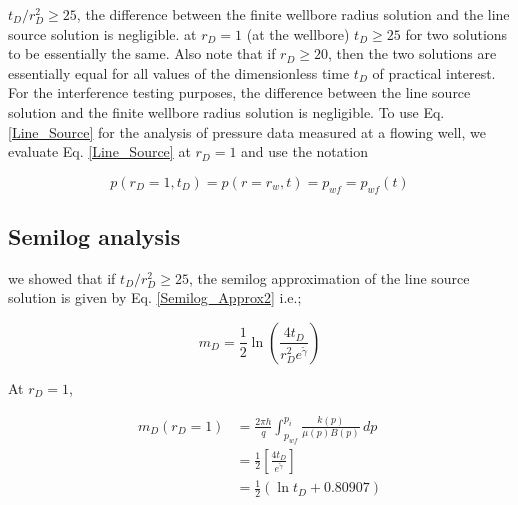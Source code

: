 \documentclass{llncs}
\numberwithin{equation}{section}
\numberwithin{figure}{section}
\numberwithin{table}{section}
\begin{document}
     $t_{D}/r_{D}^{2}\geq25$, the difference between the finite wellbore radius solution and the line source solution is negligible.  at $r_{D}=1$ (at the wellbore)  $t_{D}\geq25$  for  two solutions to be essentially the same. Also note that if $r_{D}\geq20$, then the two solutions are essentially equal for all values of the dimensionless time $t_{D}$ of practical interest.\\

    For the interference testing purposes, the difference between the line source solution and the finite wellbore radius solution is negligible.
    To use Eq. \ref{Line_Source} for the analysis of pressure data measured at a flowing well, we evaluate Eq. \ref{Line_Source} at $r_{D}=1$ and use the notation

    \begin{equation}
           p\left( {{r}_{D}}=1,{{t}_{D}} \right)=p\left( r={{r}_{w}},t \right)={{p}_{wf}}={{p}_{wf}}\left( t \right)
        \label{Pwf}
    \end{equation}

    \subsection{Semilog analysis}

     we showed that if $t_{D}/r_{D}^{2}\geq25$, the semilog approximation of the line source solution is given by Eq. \ref{Semilog_Approx2} i.e.;

    \begin{equation*}
        {{ m }_{D}}=\frac{1}{2}\ln \left( \frac{4{{t}_{D}}}{r_{D}^{2}{{e}^{\widetilde{\gamma }}}} \right)
    \end{equation*}

    At $r_{D}=1$, 

    \begin{equation}
        \begin{split}
     {{m}_{D}}\left( {{r}_{D}}=1 \right)&=\frac{2\pi h}{q}\int_{{{p}_{wf}}}^{{{p}_{i}}}{\frac{k\left( p \right)}{\mu \left( p \right)B\left( p \right)}}\,dp \\
    & =\frac{1}{2}\left[ \frac{4{{t}_{D}}}{{{e}^{\widetilde{\gamma }}}} \right] \\
    & =\frac{1}{2}\left( \ln {{t}_{D}}+0.80907 \right) \\
    \end{split}
        \label{mpwf_1}
    \end{equation}
\end{document}
